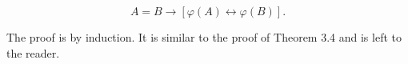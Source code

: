 $$A = B \rightarrow [\varphi(A) \leftrightarrow \varphi(B)].$$

The proof is by induction. It is similar to the proof of Theorem 3.4 and is left to the reader.

